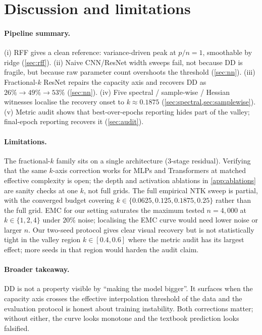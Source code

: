 \documentclass{article}
\begin{document}
\section{Discussion and limitations}
\label{sec:discussion}

\paragraph{Pipeline summary.} (i) RFF gives a clean reference: variance-driven peak at $p/n=1$, smoothable by ridge (\cref{sec:rff}). (ii) Naive CNN/ResNet width sweeps fail, not because DD is fragile, but because raw parameter count overshoots the threshold (\cref{sec:nn}). (iii) Fractional-$k$ ResNet repairs the capacity axis and recovers DD as $26\%\!\to\!49\%\!\to\!53\%$ (\cref{sec:nn}). (iv) Five spectral / sample-wise / Hessian witnesses localise the recovery onset to $k\!\approx\!0.1875$ (\cref{sec:spectral,sec:samplewise}). (v) Metric audit shows that best-over-epochs reporting hides part of the valley; final-epoch reporting recovers it (\cref{sec:audit}).

\paragraph{Limitations.} The fractional-$k$ family sits on a single architecture (3-stage residual). Verifying that the same $k$-axis correction works for MLPs and Transformers at matched effective complexity is open; the depth and activation ablations in \cref{app:ablations} are sanity checks at one $k$, not full grids. The full empirical NTK sweep is partial, with the converged budget covering $k\!\in\!\{0.0625, 0.125, 0.1875, 0.25\}$ rather than the full grid. EMC for our setting saturates the maximum tested $n=4{,}000$ at $k\!\in\!\{1,2,4\}$ under $20\%$ noise; localising the EMC curve would need lower noise or larger $n$. Our two-seed protocol gives clear visual recovery but is not statistically tight in the valley region $k\!\in\![0.4, 0.6]$ where the metric audit has its largest effect; more seeds in that region would harden the audit claim.

\paragraph{Broader takeaway.} DD is not a property visible by ``making the model bigger''. It surfaces when the capacity axis crosses the effective interpolation threshold of the data and the evaluation protocol is honest about training instability. Both corrections matter; without either, the curve looks monotone and the textbook prediction looks falsified.
\end{document}

